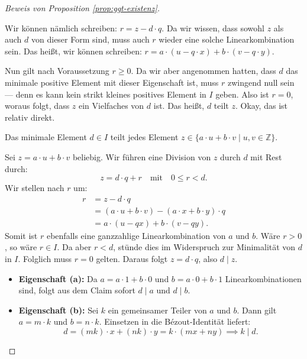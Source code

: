 \begin{proof}[Beweis von Proposition \ref{prop:ggt-existenz}]
\begin{spoken-clean}[00:20:15 - 00:22:45]
Wir können nämlich schreiben: $r = z - d \cdot q$. Da wir wissen, dass sowohl $z$ als auch $d$ von dieser Form sind, muss auch $r$ wieder eine solche Linearkombination sein. Das heißt, wir können schreiben: $r = a \cdot (u - q \cdot x) + b \cdot (v - q \cdot y)$.

Nun gilt nach Voraussetzung $r \ge 0$. Da wir aber angenommen hatten, dass $d$ das minimale positive Element mit dieser Eigenschaft ist, muss $r$ zwingend null sein --- denn es kann kein strikt kleines positives Element in $I$ geben. Also ist $r = 0$, woraus folgt, dass $z$ ein Vielfaches von $d$ ist. Das heißt, $d$ teilt $z$. Okay, das ist relativ direkt.
\end{spoken-clean}

\begin{math-stroke}
\begin{claim}
Das minimale Element $d \in I$ teilt jedes Element $z \in \{ a \cdot u + b \cdot v \mid u, v \in \mathbb{Z} \}$.
\end{claim}

\begin{short-proof}
Sei $z = a \cdot u + b \cdot v$ beliebig. Wir führen eine Division von $z$ durch $d$ mit Rest durch:
\[
z = d \cdot q + r \quad \text{mit} \quad 0 \le r < d.
\]
Wir stellen nach $r$ um:
\begin{align*}
r &= z - d \cdot q \\
&= (a \cdot u + b \cdot v) - (a \cdot x + b \cdot y) \cdot q \\
&= a \cdot (u - qx) + b \cdot (v - qy).
\end{align*}
Somit ist $r$ ebenfalls eine ganzzahlige Linearkombination von $a$ und $b$. 
Wäre $r > 0$, so wäre $r \in I$. Da aber $r < d$, stünde dies im Widerspruch zur Minimalität von $d$ in $I$. 
Folglich muss $r = 0$ gelten. Daraus folgt $z = d \cdot q$, also $d \mid z$.
\end{short-proof}

\begin{explanation-of-steps}
\begin{itemize}
    \item \textbf{Eigenschaft (a):} Da $a = a \cdot 1 + b \cdot 0$ und $b = a \cdot 0 + b \cdot 1$ Linearkombinationen sind, folgt aus dem Claim sofort $d \mid a$ und $d \mid b$.
    \item \textbf{Eigenschaft (b):} Sei $k$ ein gemeinsamer Teiler von $a$ und $b$. Dann gilt $a = m \cdot k$ und $b = n \cdot k$. Einsetzen in die Bézout-Identität liefert:
    \[ d = (mk) \cdot x + (nk) \cdot y = k \cdot (mx + ny) \implies k \mid d. \]
\end{itemize}
\end{explanation-of-steps}
\end{math-stroke}


\end{proof}
